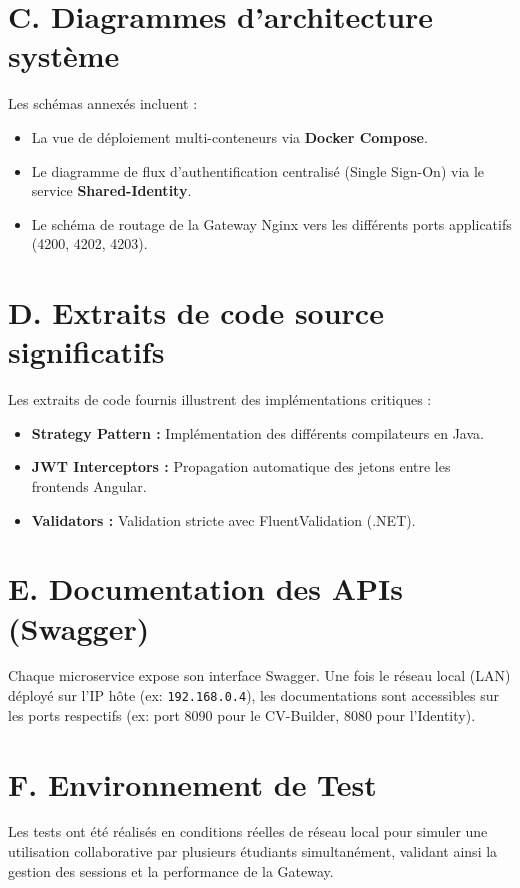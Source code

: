 \documentclass[12pt,a4paper]{report}
\begin{document}
    \section*{C. Diagrammes d'architecture système}
    Les schémas annexés incluent :
    \begin{itemize}
        \item La vue de déploiement multi-conteneurs via \textbf{Docker Compose}.
        \item Le diagramme de flux d'authentification centralisé (Single Sign-On) via le service \textbf{Shared-Identity}.
        \item Le schéma de routage de la Gateway Nginx vers les différents ports applicatifs (4200, 4202, 4203).
    \end{itemize}

    \section*{D. Extraits de code source significatifs}
    Les extraits de code fournis illustrent des implémentations critiques :
    \begin{itemize}
        \item \textbf{Strategy Pattern :} Implémentation des différents compilateurs en Java.
        \item \textbf{JWT Interceptors :} Propagation automatique des jetons entre les frontends Angular.
        \item \textbf{Validators :} Validation stricte avec FluentValidation (.NET).
    \end{itemize}

    \section*{E. Documentation des APIs (Swagger)}
    Chaque microservice expose son interface Swagger. Une fois le réseau local (LAN) déployé sur l'IP hôte (ex: \texttt{192.168.0.4}), les documentations sont accessibles sur les ports respectifs (ex: port 8090 pour le CV-Builder, 8080 pour l'Identity).

    \section*{F. Environnement de Test}
    Les tests ont été réalisés en conditions réelles de réseau local pour simuler une utilisation collaborative par plusieurs étudiants simultanément, validant ainsi la gestion des sessions et la performance de la Gateway.
\end{document}
